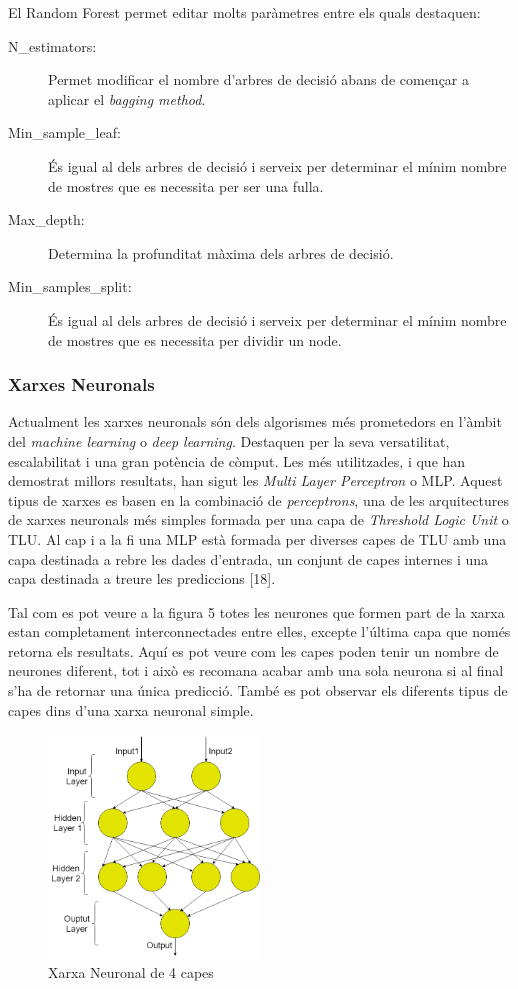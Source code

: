 \documentclass[10pt,a4paper,twocolumn,twoside]{article}
\begin{document}
El Random Forest permet editar molts paràmetres entre els quals destaquen:
\begin{description}
\item[N\_estimators:] Permet modificar el nombre d'arbres de decisió abans de començar a aplicar el \textit{bagging method}.
\item[Min\_sample\_leaf:] És igual al dels arbres de decisió i serveix per determinar el mínim nombre de mostres que es necessita per ser una fulla.
\item[Max\_depth:] Determina la profunditat màxima dels arbres de decisió.
\item[Min\_samples\_split:] És igual al dels arbres de decisió i serveix per determinar el mínim nombre de mostres que es necessita per dividir un node.
\end{description}

\subsubsection{Xarxes Neuronals}
Actualment les xarxes neuronals són dels algorismes més prometedors en l'àmbit del \textit{machine learning} o \textit{deep learning}. Destaquen per la seva versatilitat, escalabilitat i una gran potència de còmput. Les més utilitzades, i que han demostrat millors resultats, han sigut les \textit{Multi Layer Perceptron} o MLP. Aquest tipus de xarxes es basen en la combinació de \textit{perceptrons}, una de les arquitectures de xarxes neuronals més simples formada per una capa de \textit{Threshold Logic Unit} o TLU. Al cap i a la fi una MLP està formada per diverses capes de TLU amb una capa destinada a rebre les dades d'entrada, un conjunt de capes internes i una capa destinada a treure les prediccions [18].

Tal com es pot veure a la figura 5 totes les neurones que formen part de la xarxa estan completament interconnectades entre elles, excepte l'última capa que només retorna els resultats. Aquí es pot veure com les capes poden tenir un nombre de neurones diferent, tot i això es recomana acabar amb una sola neurona si al final s'ha de retornar una única predicció. També es pot observar els diferents tipus de capes dins d'una xarxa neuronal simple.
 \begin{figure}[!h]
\centering
	\includegraphics[width=0.5\textwidth]{../img/XarxaNeur}
	\caption{Xarxa Neuronal de 4 capes}
	\label{fig-XarxaNeur}
\end{figure}
\end{document}
